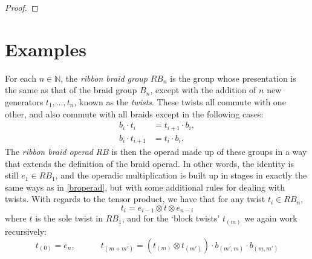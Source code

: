 \begin{proof}

\end{proof}



\section{Examples}

\begin{Defi} For each $n \in \mathbb{N}$, the \emph{ribbon braid group} $RB_{n}$ is the group whose presentation is the same as that of the braid group $B_{n}$, except with the addition of $n$ new generators $t_1, \ldots, t_n$, known as the \emph{twists}. These twists all commute with one other, and also commute with all braids except in the following cases:
  \begin{align*}
    b_i \cdot t_i &= t_{i+1} \cdot b_i,\\
    b_i \cdot t_{i+1} &= t_i \cdot b_i.
  \end{align*}
The \emph{ribbon braid operad} $RB$ is then the operad made up of these groups in a way that extends the definition of the braid operad. In other words, the identity is still $e_1 \in RB_1$, and the operadic multiplication is built up in stages in exactly the same ways as in \cref{broperad}, but with some additional rules for dealing with twists. With regards to the tensor product, we have that for any twist $t_i \in RB_{n}$,
  \[
    t_i = e_{i-1} \otimes t \otimes e_{n-i}
  \]
where $t$ is the sole twist in $RB_1$, and for the `block twists' $t_{(m)}$ we again work recursively:
  \[
    t_{(0)} = e_n, \quad \quad \quad t_{(m+m')} = \left(t_{(m)} \otimes t_{(m')}\right) \cdot b_{(m', m)} \cdot b_{(m, m')}
  \]
\end{Defi}

